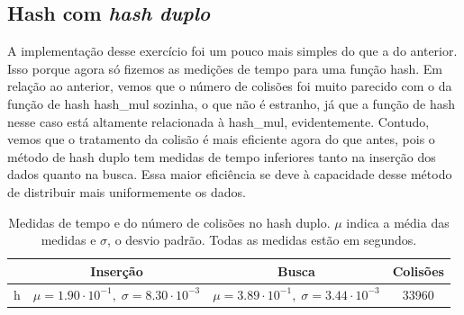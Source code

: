 \documentclass{article}
\begin{document}
\subsection{Hash com \textit{hash duplo}}
A implementação desse exercício foi um pouco mais simples do que a do anterior. Isso porque agora só fizemos as medições de tempo para uma função hash. Em relação ao anterior, vemos que o número de colisões foi muito parecido com o da função de hash hash\_mul sozinha, o que não é estranho, já que a função de hash nesse caso está altamente relacionada à hash\_mul, evidentemente. Contudo, vemos que o tratamento da colisão é mais eficiente agora do que antes, pois o método de hash duplo tem medidas de tempo inferiores tanto na inserção dos dados quanto na busca. Essa maior eficiência se deve à capacidade desse método de distribuir mais uniformemente os dados.
\begin{table}[h!]
    \begin{tabular}{c|c|c|c}
         & Inserção & Busca & Colisões \\ 
        \hline
        h & $\mu = 1.90\cdot 10^{-1},\;\sigma = 8.30\cdot10^{-3}$ & $\mu=3.89\cdot 10^{-1},\;\sigma = 3.44\cdot 10^{-3}$ & 33960 \\
    \end{tabular}
    \caption{Medidas de tempo e do número de colisões no hash duplo. $\mu$ indica a média das medidas e $\sigma$, o desvio padrão. Todas as medidas estão em segundos.}
\end{table}
%
\end{document}
